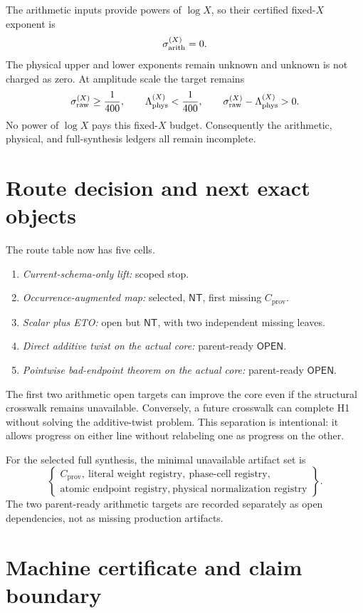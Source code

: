 \documentclass[11pt]{article}
\theoremstyle{definition}
\newcommand{\NT}{\mathsf{NT}}
\newcommand{\OPEN}{\mathsf{OPEN}}
\begin{document}
The arithmetic inputs provide powers of \(\log X\), so their certified
fixed-\(X\) exponent is
\[
 \sigma_{\rm arith}^{(X)}=0.
\]
The physical upper and lower exponents remain unknown and unknown is
not charged as zero.  At amplitude scale the target remains
\[
 \sigma_{\rm raw}^{(X)}\ge\frac1{400},\qquad
 \Lambda_{\rm phys}^{(X)}<\frac1{400},\qquad
 \sigma_{\rm raw}^{(X)}-\Lambda_{\rm phys}^{(X)}>0.
\]
No power of \(\log X\) pays this fixed-\(X\) budget.  Consequently
the arithmetic, physical, and full-synthesis ledgers all remain
incomplete.

\section{Route decision and next exact objects}

The route table now has five cells.
\begin{enumerate}[leftmargin=2.2em]
  \item \emph{Current-schema-only lift:} scoped stop.
  \item \emph{Occurrence-augmented map:} selected,
  \(\NT\), first missing \(C_{\mathrm{prov}}\).
  \item \emph{Scalar plus ETO:} open but \(\NT\), with two independent
  missing leaves.
  \item \emph{Direct additive twist on the actual core:} parent-ready
  \(\OPEN\).
  \item \emph{Pointwise bad-endpoint theorem on the actual core:}
  parent-ready \(\OPEN\).
\end{enumerate}

The first two arithmetic open targets can improve the core even if
the structural crosswalk remains unavailable.  Conversely, a future
crosswalk can complete H1 without solving the additive-twist problem.
This separation is intentional: it allows progress on either line
without relabeling one as progress on the other.

For the selected full synthesis, the minimal unavailable artifact set
is
\[
\left\{
\begin{array}{l}
C_{\mathrm{prov}},\
\text{literal weight registry},\
\text{phase-cell registry},\\
\text{atomic endpoint registry},\
\text{physical normalization registry}
\end{array}
\right\}.
\]
The two parent-ready arithmetic targets are recorded separately as
open dependencies, not as missing production artifacts.

\section{Machine certificate and claim boundary}
\end{document}
